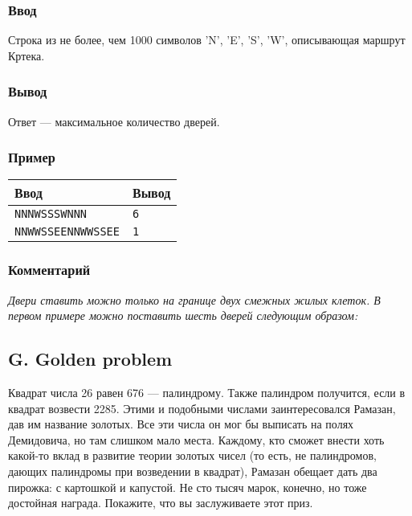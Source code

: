 \documentclass[10pt, a4paper]{article}
\newcommand{\informat}[1]
{
	\subsubsection*{Ввод} #1
}
\newcommand{\outformat}[1]
{
	\subsubsection*{Вывод} #1
}
\newcommand{\examplee}[4]
{
	\subsubsection*{Пример}
	\noindent
	\begin{center}
	\begin{tabularx}{\linewidth}{|X|X|}
	\hline
	Ввод 	& Вывод  	\\
	\hline
	{\tt #1} & {\tt #2}	\\
	\hline
	{\tt #3} & {\tt #4}	\\
	\hline
	\end{tabularx}
	\end{center}
}
\newcommand{\excomm}[1]
{
	\subsubsection*{Комментарий}
	\textit{#1}
}
\begin{document}
\informat{Строка из не более, чем 1000 символов 'N', 'E', 'S', 'W', описывающая маршрут Кртека.}

\outformat{Ответ --- максимальное количество дверей.}

\examplee{NNNWSSSWNNN}{6}
{NNWWSSEENNWWSSEE}{1}

\excomm{Двери ставить можно только на границе двух смежных жилых клеток. В первом примере можно поставить шесть дверей следующим образом: }

\begin{center}
\end{center}




\subsection*{G. Golden problem}


Квадрат числа 26 равен 676 --- палиндрому. Также палиндром получится, если в квадрат возвести 2285. Этими и подобными числами заинтересовался Рамазан, дав им название золотых. Все эти числа он мог бы выписать на полях Демидовича, но там слишком мало места. Каждому, кто сможет внести хоть какой-то вклад в развитие теории золотых чисел (то есть, не палиндромов, дающих палиндромы при возведении в квадрат), Рамазан обещает дать два пирожка: с картошкой и капустой. Не сто тысяч марок, конечно, но тоже до\-стой\-ная награда. Покажите, что вы заслуживаете этот приз.
\end{document}
